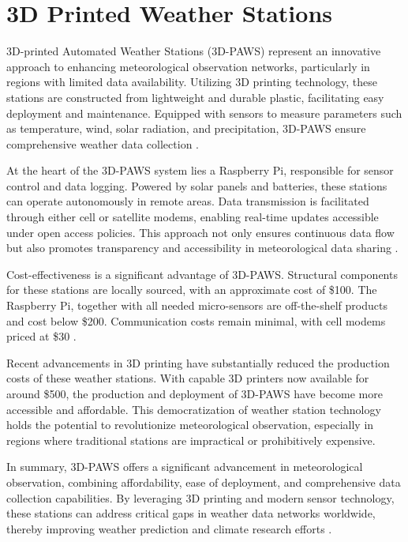 \section{3D Printed Weather Stations}
\label{sec: 3d_printed_stations}

3D-printed Automated Weather Stations (3D-PAWS) represent an innovative approach to enhancing meteorological observation networks, particularly in regions with limited data availability. Utilizing 3D printing technology, these stations are constructed from lightweight and durable plastic, facilitating easy deployment and maintenance. Equipped with sensors to measure parameters such as temperature, wind, solar radiation, and precipitation, 3D-PAWS ensure comprehensive weather data collection \cite{mwangi2017paws}.

At the heart of the 3D-PAWS system lies a Raspberry Pi, responsible for sensor control and data logging. Powered by solar panels and batteries, these stations can operate autonomously in remote areas. Data transmission is facilitated through either cell or satellite modems, enabling real-time updates accessible under open access policies. This approach not only ensures continuous data flow but also promotes transparency and accessibility in meteorological data sharing \cite{mwangi2017paws}.

Cost-effectiveness is a significant advantage of 3D-PAWS. Structural components for these stations are locally sourced, with an approximate cost of \$100. The Raspberry Pi, together with all needed micro-sensors are off-the-shelf products and cost below \$200. Communication costs remain minimal, with cell modems priced at \$30 \cite{mwangi2017paws}.

Recent advancements in 3D printing have substantially reduced the production costs of these weather stations. With capable 3D printers now available for around \$500, the production and deployment of 3D-PAWS have become more accessible and affordable. This democratization of weather station technology holds the potential to revolutionize meteorological observation, especially in regions where traditional stations are impractical or prohibitively expensive.

In summary, 3D-PAWS offers a significant advancement in meteorological observation, combining affordability, ease of deployment, and comprehensive data collection capabilities. By leveraging 3D printing and modern sensor technology, these stations can address critical gaps in weather data networks worldwide, thereby improving weather prediction and climate research efforts \cite{muita2021}.

